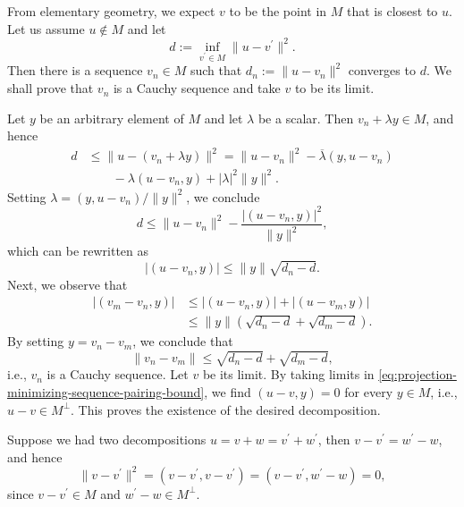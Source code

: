 \begin{Proof}
From elementary geometry, we expect $v$ to be the point in $M$ that is closest to $u$. Let us assume $u\notin M$ and let
\begin{equation}\label{eq:hilbert-projection-infimum-distance}
d:=\inf_{v^{\prime}\in M}\|u-v^{\prime}\|^2.
\end{equation}
Then there is a sequence $v_n\in M$ such that $d_n:=\|u-v_n\|^2$ converges to $d$. We shall prove that $v_n$ is a Cauchy sequence and take $v$ to be its limit.

Let $y$ be an arbitrary element of $M$ and let $\lambda$ be a scalar. Then $v_n+\lambda y\in M$, and hence
\begin{equation}\label{eq:projection-minimizing-sequence-perturbation}
\begin{aligned}
d&\leq\|u-(v_n+\lambda y)\|^2=\|u-v_n\|^2-\overline\lambda(y,u-v_n)\\
&\qquad-\lambda(u-v_n,y)+|\lambda|^2\|y\|^2.
\end{aligned}
\end{equation}
Setting $\lambda=(y,u-v_n)/\|y\|^2$, we conclude
\begin{equation}\label{eq:projection-minimizing-sequence-optimized-bound}
d\leq\|u-v_n\|^2-\dfrac{|(u-v_n,y)|^2}{\|y\|^2},
\end{equation}
which can be rewritten as
\begin{equation}\label{eq:projection-minimizing-sequence-pairing-bound}
|(u-v_n,y)|\leq\|y\|\sqrt{d_n-d}.
\end{equation}
Next, we observe that
\begin{equation}\label{eq:projection-minimizing-sequence-difference-pairing}
\begin{aligned}
|(v_m-v_n,y)|&\leq|(u-v_n,y)|+|(u-v_m,y)|\\
&\leq\|y\|(\sqrt{d_n-d}+\sqrt{d_m-d}).
\end{aligned}
\end{equation}
By setting $y=v_n-v_m$, we conclude that
\begin{equation}\label{eq:projection-minimizing-sequence-cauchy-bound}
\|v_n-v_m\|\leq\sqrt{d_n-d}+\sqrt{d_m-d},
\end{equation}
i.e., $v_n$ is a Cauchy sequence. Let $v$ be its limit. By taking limits in \eqref{eq:projection-minimizing-sequence-pairing-bound}, we find $(u-v,y)=0$ for every $y\in M$, i.e., $u-v\in M^\perp$. This proves the existence of the desired decomposition.

Suppose we had two decompositions $u=v+w=v^{\prime}+w^{\prime}$, then $v-v^{\prime}=w^{\prime}-w$, and hence
\begin{equation}\label{eq:orthogonal-projection-decomposition-uniqueness}
\|v-v^{\prime}\|^2=(v-v^{\prime},v-v^{\prime})=(v-v^{\prime},w^{\prime}-w)=0,
\end{equation}
since $v-v^{\prime}\in M$ and $w^{\prime}-w\in M^\perp$.
\end{Proof}

